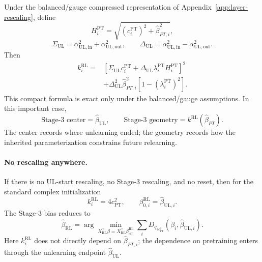 \documentclass[11pt]{article}
\begin{document}
Under the balanced/gauge compressed representation of Appendix~\ref{app:layer-rescaling}, define
\begin{equation}
    H_i^{\mathrm{PT}}
    =
    \sqrt{
    (c_i^{\mathrm{PT}})^2
    +
    \widehat\beta_{PT,i}^2
    },
\end{equation}
\begin{equation}
    \Sigma_{\mathrm{UL}}
    =
    \alpha_{\mathrm{UL,in}}^2+\alpha_{\mathrm{UL,out}}^2,
    \qquad
    \Delta_{\mathrm{UL}}
    =
    \alpha_{\mathrm{UL,in}}^2-\alpha_{\mathrm{UL,out}}^2.
\end{equation}
Then
\begin{equation}
    \boxed{
    \begin{aligned}
    k_i^{\mathrm{RL}}
    =
    &\left[
    \Sigma_{\mathrm{UL}}c_i^{\mathrm{PT}}
    +
    \Delta_{\mathrm{UL}}\lambda_i^{\mathrm{PT}}H_i^{\mathrm{PT}}
    \right]^2 \\
    &+
    \Delta_{\mathrm{UL}}^2
    \widehat\beta_{PT,i}^2
    \left[
    1-(\lambda_i^{\mathrm{PT}})^2
    \right].
    \end{aligned}
    }
\end{equation}
This compact formula is exact only under the balanced/gauge assumptions. In this important case,
\begin{equation}
    \boxed{
    \text{Stage-3 center}=\widehat\beta_{\mathrm{UL}},
    \qquad
    \text{Stage-3 geometry}=k^{\mathrm{RL}}(\widehat\beta_{PT}).
    }
\end{equation}
The center records where unlearning ended; the geometry records how the inherited parameterization constrains future relearning.

\paragraph{No rescaling anywhere.}
If there is no UL-start rescaling, no Stage-3 rescaling, and no reset, then for the standard complex initialization
\begin{equation}
    k_i^{\mathrm{RL}}=4c_{\mathrm{PT}}^2,
    \qquad
    \beta_{0,i}^{\mathrm{RL}}=\widehat\beta_{\mathrm{UL},i}.
\end{equation}
The Stage-3 bias reduces to
\begin{equation}
    \boxed{
    \widehat\beta_{\mathrm{RL}}
    =
    \arg\min_{
    X_{\mathrm{RL}}^\top\beta
    =
    X_{\mathrm{RL}}^\top\beta_{\mathrm{eff}}^{\mathrm{RL}}
    }
    \sum_i
    D_{q_{4c_{\mathrm{PT}}^2}}
    \left(
        \beta_i,
        \widehat\beta_{\mathrm{UL},i}
    \right).
    }
\end{equation}
Here \(k_i^{\mathrm{RL}}\) does not directly depend on \(\widehat\beta_{PT,i}\); the dependence on pretraining enters through the unlearning endpoint \(\widehat\beta_{\mathrm{UL}}\).
\end{document}
